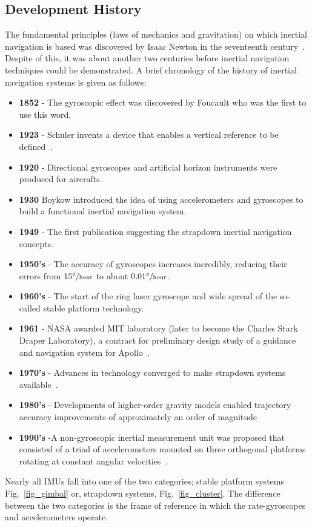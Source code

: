 \documentclass[journal]{IEEEtran}
\begin{document}
\subsection{Development History}
The fundamental principles (laws of mechanics and gravitation) on which inertial navigation is based was discovered by Isaac Newton in the seventeenth century~\cite{titterton2004strapdown}. Despite of this, it was about another two centuries before inertial navigation techniques could be demonstrated. A brief chronology of the history of inertial navigation systems is given as follows:
 \begin{itemize}[label={\small\raisebox{0.2ex}{\textbullet}}]
 \item \textbf{1852} - The gyroscopic effect was discovered by Foucault who was the first to use this word.
 \item \textbf{1923} - Schuler invents a device that enables a vertical reference to be defined~\cite{schuler1923storung}.
 \item \textbf{1920} - Directional gyroscopes and artificial horizon instruments were produced for aircrafts.
 \item \textbf{1930} Boykow introduced the idea of using accelerometers and gyroscopes to build a functional inertial navigation system.
 \item \textbf{1949} - The first publication suggesting the strapdown inertial navigation concepts. 
 \item \textbf{1950's} - The accuracy of gyroscopes increases incredibly, reducing their errors from $\unitfrac[15^{\circ}]{\!}{hour}$ to about $\unitfrac[0.01^{\circ}]{\!}{hour}$.
 \item \textbf{1960's} - The start of the ring laser gyroscope and wide spread of the so-called stable platform technology.
 \item \textbf{1961} - NASA awarded MIT laboratory (later to become the Charles Stark Draper Laboratory), a contract for preliminary design study of a guidance and navigation system for Apollo~\cite{battin1982space}\cite{draper1965guidance}.
 \item \textbf{1970's} - Advances in technology converged to make strapdown systems available~\cite{tazartes2014historical}.
  \item \textbf{1980's} - Developments of higher-order gravity models enabled trajectory accuracy improvements of approximately an order of magnitude~\cite{reams1983effects}\cite{ford1983gravitational}
  \item \textbf{1990's} -A non-gyroscopic inertial measurement unit was proposed that consisted of a triad of
accelerometers mounted on three orthogonal platforms rotating at constant angular velocities~\cite{merhav1982nongyroscopic}.
 \end{itemize}
Nearly all IMUs fall into one of the two categories; stable platform systems Fig.~\ref{fig_gimbal}
or, strapdown systems, Fig.~\ref{fig_cluster}. The difference between the two
categories is the frame of reference in which the rate-gyroscopes and accelerometers operate.
\end{document}
